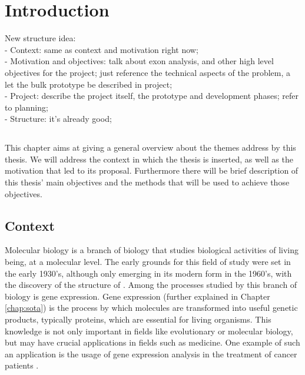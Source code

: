 \chapter{Introduction} \label{chap:intro}

New structure idea:\\
  - Context: same as context and motivation right now;\\
  - Motivation and objectives: talk about exon analysis, and other high level
    objectives for the project; just reference the technical aspects of the
    problem, a let the bulk prototype be described in project;\\
  - Project: describe the project itself, the prototype and development phases;
    refer to planning;\\
  - Structure: it's already good;\\

\section*{}

This chapter aims at giving a general overview about the themes address by this
thesis. We will address the context in which the thesis is inserted, as well as
the motivation that led to its proposal. Furthermore there will be brief
description of this thesis' main objectives and the methods that will be used to
achieve those objectives.

\section{Context} \label{sec:context}

Molecular biology is a branch of biology that studies biological activities of
living being, at a molecular level. The early grounds for this field of study
were set in the early 1930's, although only emerging in its modern form in the
1960's, with the discovery of the structure of \dna. Among the processes studied
by this branch of biology is gene expression. Gene expression (further explained
in Chapter \ref{chap:sota}) is the process by which \dna{} molecules are
transformed into useful genetic products, typically proteins, which are
essential for living organisms. This knowledge is not only important in fields
like evolutionary or molecular biology, but may have crucial applications in
fields such as medicine. One example of such an application is the usage of gene
expression analysis in the treatment of cancer patients \cite{Pusztai01062003}.

